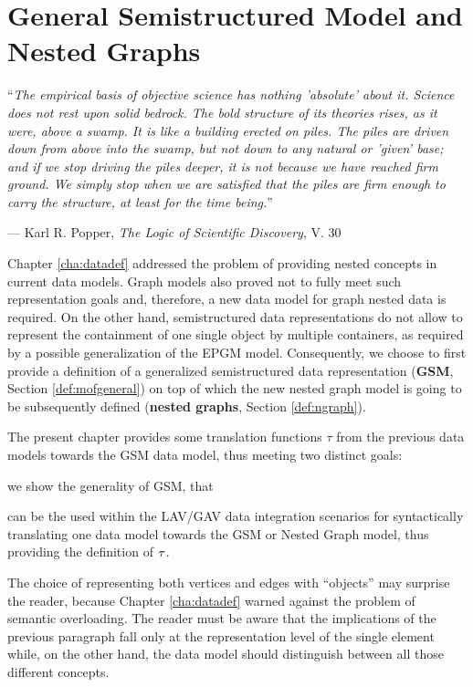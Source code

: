 \chapter{General Semistructured Model and Nested Graphs}\label{cha:graphsdef}
\epigraph{``\textit{The empirical basis of objective science has nothing 'absolute' about it. Science does not rest upon solid bedrock. The bold structure of its theories rises, as it were, above a swamp. It is like a building erected on piles. The piles are driven down from above into the swamp, but not down to any natural or 'given' base; and if we stop driving the piles deeper, it is not because we have reached firm ground. We simply stop when we are satisfied that the piles are firm enough to carry the structure, at least for the time being.}''}{--- Karl R. Popper, \textit{The Logic of Scientific Discovery}, V. 30}


Chapter \vref{cha:datadef} addressed the problem of providing nested concepts in current data models. Graph models also proved not to fully meet such representation goals and, therefore, a new data model for graph nested data is required. On the other hand, semistructured data representations do not allow to represent the containment of one single object by multiple containers, as required by a possible generalization of the EPGM model. Consequently, we choose to first provide a definition of a generalized semistructured data representation (\textbf{GSM}, Section \ref{def:mofgeneral}) on top of which the new nested graph model is going to be subsequently defined (\textbf{nested graphs}, Section \ref{def:ngraph}). 

The present chapter provides some translation functions $\tau$ from the previous data models towards the GSM data model, thus meeting two distinct goals: \begin{mylist}
	\item we show the generality of GSM, that
	\item can be the used within the LAV/GAV   data integration scenarios for syntactically translating one data model towards the GSM or Nested Graph model, thus providing the definition of $\ttransl$.
\end{mylist}
The choice of representing both vertices and edges with ``objects'' may surprise the reader, because Chapter \ref{cha:datadef} warned against the problem of semantic overloading. The reader must be aware that the implications of the previous paragraph fall only at the representation level of the single element while, on the other hand, the data model should distinguish between all those different concepts.



